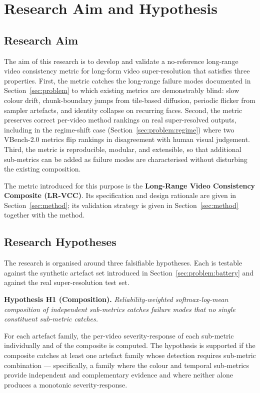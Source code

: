 \section{Research Aim and Hypothesis}
\label{sec:aim}

\subsection{Research Aim}

The aim of this research is to develop and validate a no-reference long-range video
consistency metric for long-form video super-resolution that satisfies three properties.
First, the metric catches the long-range failure modes documented in
Section~\ref{sec:problem} to which existing metrics are demonstrably blind: slow colour
drift, chunk-boundary jumps from tile-based diffusion, periodic flicker from sampler
artefacts, and identity collapse on recurring faces. Second, the metric preserves correct
per-video method rankings on real super-resolved outputs, including in the regime-shift
case (Section~\ref{sec:problem:regime}) where two VBench-2.0 metrics flip rankings in
disagreement with human visual judgement. Third, the metric is reproducible, modular, and
extensible, so that additional sub-metrics can be added as failure modes are characterised
without disturbing the existing composition.

The metric introduced for this purpose is the \textbf{Long-Range Video Consistency
Composite (LR-VCC)}. Its specification and design rationale are given in
Section~\ref{sec:method}; its validation strategy is given in Section~\ref{sec:method}
together with the method.

\subsection{Research Hypotheses}

The research is organised around three falsifiable hypotheses. Each is testable against the
synthetic artefact set introduced in Section~\ref{sec:problem:battery} and against the real
super-resolution test set.

\textbf{Hypothesis H1 (Composition).}
\textit{Reliability-weighted softmax-log-mean composition of independent sub-metrics catches
failure modes that no single constituent sub-metric catches.}

For each artefact family, the per-video severity-response of each sub-metric individually
and of the composite is computed. The hypothesis is supported if the composite catches at
least one artefact family whose detection requires sub-metric combination --- specifically,
a family where the colour and temporal sub-metrics provide independent and complementary
evidence and where neither alone produces a monotonic severity-response.

